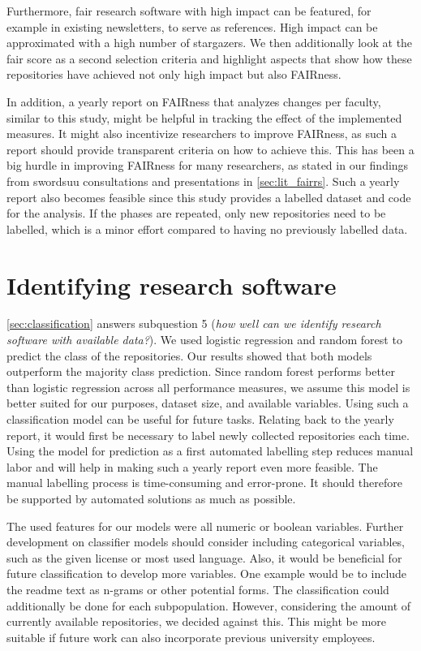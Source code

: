 Furthermore, \acrshort{fair} research software with high impact can be featured, for example in existing newsletters, to serve as references. High impact can be approximated with a high number of stargazers. We then additionally look at the \acrshort{fair} score as a second selection criteria and highlight aspects that show how these repositories have achieved not only high impact but also FAIRness. 


In addition, a yearly report on FAIRness that analyzes changes per faculty, similar to this study, might be helpful in tracking the effect of the implemented measures. It might also incentivize researchers to improve FAIRness, as such a report should provide transparent criteria on how to achieve this. This has been a big hurdle in improving FAIRness for many researchers, as stated in our findings from \acrshort{swordsuu} consultations and presentations in \autoref{sec:lit_fairrs}. Such a yearly report also becomes feasible since this study provides a labelled dataset and code for the analysis. If the phases are repeated, only new repositories need to be labelled, which is a minor effort compared to having no previously labelled data. 


\section{Identifying research software}
\label{sec:disc:sq5}
\autoref{sec:classification} answers subquestion 5 (\textit{how well can we identify research software with available data?}). We used logistic regression and random forest to predict the class of the repositories. Our results showed that both models outperform the majority class prediction. Since random forest performs better than logistic regression across all performance measures, we assume this model is better suited for our purposes, dataset size, and available variables. Using such a classification model can be useful for future tasks. Relating back to the yearly report, it would first be necessary to label newly collected repositories each time. Using the model for prediction as a first automated labelling step reduces manual labor and will help in making such a yearly report even more feasible. The manual labelling process is time-consuming and error-prone. It should therefore be supported by automated solutions as much as possible.

The used features for our models were all numeric or boolean variables. Further development on classifier models should consider including categorical variables, such as the given license or most used language. Also, it would be beneficial for future classification to develop more variables. One example would be to include the readme text as n-grams or other potential forms. The classification could additionally be done for each subpopulation. However, considering the amount of currently available repositories, we decided against this. This might be more suitable if future work can also incorporate previous university employees.

